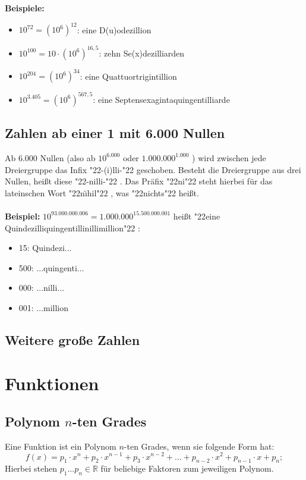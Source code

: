\documentclass[a4paper]{article}
\newcommand{\q}[1]{\char"22{#1}\char"22 }
\begin{document}
\\
\\
\textbf{Beispiele:}
\begin{itemize}
	\item $ 10^{72} = (10^6)^{12} $: eine D(u)odezillion
	\item $ 10^{100} = 10 \cdot (10^6)^{16,5} $: zehn Se(x)dezilliarden
	\item $ 10^{204} = (10^6)^{34} $: eine Quattuortrigintillion
	\item $ 10^{3.405} = (10^6)^{567,5} $: eine Septensexagintaquingentilliarde
\end{itemize}

\subsection{Zahlen ab einer 1 mit 6.000 Nullen}
Ab 6.000 Nullen (also ab $ 10 ^ {6.000} $ oder $ 1.000.000^{1.000} $ ) wird zwischen jede Dreiergruppe das Infix \q{-(i)lli-} geschoben.
Besteht die Dreiergruppe aus drei Nullen,
hei{\ss}t diese \q{-nilli-}.
Das Pr\"afix \q{ni} steht hierbei f\"ur das lateinschen Wort \q{n{\u\i}hil},
was \q{nichts} hei{\ss}t.
\\
\\
\textbf{Beispiel:} $ 10^{93.000.000.006} = 1.000.000^{15.500.000.001} $ hei{\ss}t \q{eine Quindezilliquingentillinillimillion}:
\begin{itemize}[nosep]
	\item 15: Quindezi...
	\item 500: ...quingenti...
	\item 000: ...nilli...
	\item 001: ...million
\end{itemize}

\subsection{Weitere gro{\ss}e Zahlen}


\newpage
\section{Funktionen}

\subsection{Polynom $n$-ten Grades}
Eine Funktion ist ein Polynom $n$-ten Grades,
wenn sie folgende Form hat:
\[
	f(x) = p_1 \cdot x^n + p_2 \cdot x^{n - 1} + p_3 \cdot x^{n - 2} + ... + p_{n - 2} \cdot x^2 + p_{n - 1} \cdot x + p_n ;
\]
Hierbei stehen
$p_1 ... p_n \in \mathbb{R} $
f\"ur beliebige Faktoren zum jeweiligen Polynom.
\end{document}
